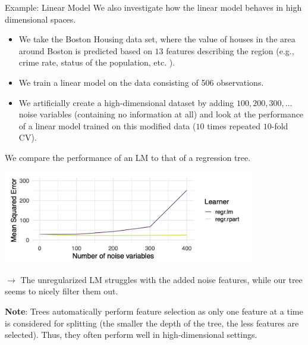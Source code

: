 \begin{vbframe}{Example: Linear Model}
We also investigate how the linear model behaves in high dimensional spaces.

\begin{itemize}
\item We take the Boston Housing data set, where the value of houses in the area around Boston is predicted based on $13$ features describing the region (e.g., crime rate, status of the population, etc. ).
\item We train a linear model on the data consisting of 506 observations. 
\item We artificially create a high-dimensional dataset by adding $100, 200, 300, ...$ noise variables (containing no information at all) and look at the performance of a linear model trained on this modified data ($10$ times repeated $10$-fold CV).
\end{itemize}
\framebreak

We compare the performance of an LM to that of a regression tree.

\vspace*{0.1cm}
\begin{center}
\includegraphics[width = 11cm ]{figure_man/MSE.png}
\end{center}


$\rightarrow$ The unregularized LM struggles with the added noise features, while our tree seems to nicely filter them out.

\vfill

\begin{footnotesize}
\textbf{Note}: Trees automatically perform feature selection as only one feature at a time is considered for splitting (the smaller the depth of the tree, the less features are selected). Thus, they often perform well in high-dimensional settings. 
\end{footnotesize}


\end{vbframe}
